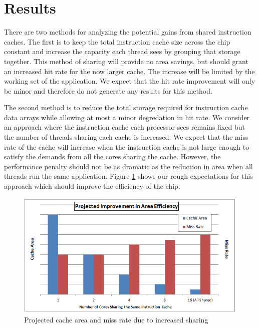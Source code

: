 \section{Results}

There are two methods for analyzing the potential gains from shared
instruction caches.
The first is to keep the total instruction cache size across the chip
constant and increase the capacity each thread sees by grouping that
storage together.
This method of sharing will provide no area savings, but should grant
an increased hit rate for the now larger cache.
The increase will be limited by the working set of the application.
We expect that the hit rate improvement will only be minor and
therefore do not generate any results for this method.


The second method is to reduce the total storage required for
instruction cache data arrays while allowing at most a minor
degredation in hit rate.
We consider an approach where the instruction cache each processor
sees remains fixed but the number of threads sharing each cache is
increased. 
We expect that the miss rate of the cache will increase when the instruction
cache is not large enough to satisfy the demands from all the cores
sharing the cache.
However, the performance penalty should not be as dramatic as the
reduction in area when all threads run the same application.
Figure \ref{AreaEff} shows our rough expectations for this approach
which should improve the efficiency of the chip.

\begin{figure}
\centering
\includegraphics[width=\columnwidth]{graphics/AreaEff.png}
\caption{Projected cache area and miss rate due to increased sharing}
\label{AreaEff}
\end{figure}


